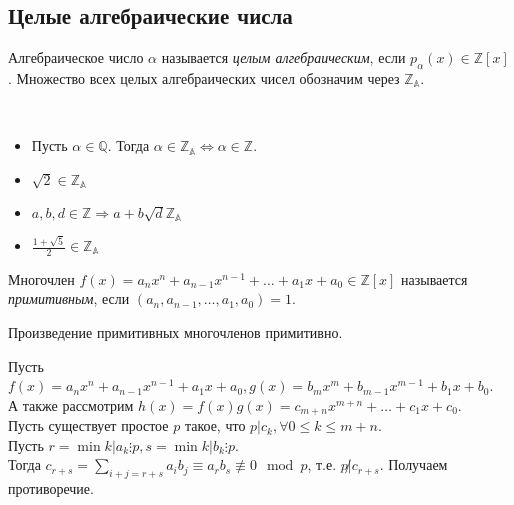\subsection{Целые алгебраические числа}

\begin{definition}
	Алгебраическое число $\alpha$ называется \textit{целым алгебраическим}, если $p_{\alpha}(x) \in \mathbb{Z}[x]$. Множество всех целых алгебраических чисел обозначим через $\mathbb{Z}_{\mathbb{A}}$.
\end{definition}

\begin{example}~\
	\begin{itemize}[nolistsep]
		\item Пусть $\alpha \in \mathbb{Q}$. Тогда $\alpha \in \mathbb{Z_{\mathbb{A}}} \Leftrightarrow \alpha \in \mathbb{Z}$.
		\item $\sqrt{2} \in \mathbb{Z_{\mathbb{A}}}$
		\item $a, b, d \in \mathbb{Z} \Rightarrow a + b\sqrt{d} \mathbb{Z_{\mathbb{A}}}$
		\item $\frac{1 + \sqrt{5}}{2} \in \mathbb{Z_{\mathbb{A}}}$ 
	\end{itemize}
\end{example}

\begin{definition}
	Многочлен $f(x) = a_n x^n + a_{n - 1} x^{n - 1} + \ldots + a_1 x + a_0 \in \mathbb{Z}[x]$ называется \textit{примитивным}, если  $(a_n, a_{n - 1}, \ldots, a_1, a_0) = 1$.
\end{definition}

\begin{lemma}[Гаусса] \label{l11_Gauss_lemma}
	Произведение примитивных многочленов примитивно.
\end{lemma}
\begin{pf}
	Пусть $f(x) = a_n x^n + a_{n - 1}x^{n - 1} + a_1 x + a_0, g(x) = b_m x^m + b_{m - 1} x^{m - 1} + b_1 x + b_0$.\\
	А также рассмотрим $h(x) = f(x) g(x) = c_{m + n} x^{m + n} + \ldots + c_1 x + c_0$.\\
	Пусть существует простое $p$ такое, что $p | c_k, \forall 0 \leq k \leq m + n$.\\
	Пусть $r = \min{k | a_k \vdots p}, s = \min{k | b_k \vdots p}$.\\
	Тогда $\displaystyle c_{r + s } = \sum_{i + j = r + s} a_i b_j \equiv a_r b_s \not \equiv 0 \mod p$, т.е. $p \not | c_{r + s}$. Получаем противоречие.
\end{pf}

